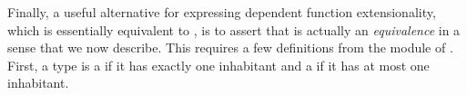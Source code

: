 Finally, a useful alternative for expressing dependent function extensionality, which is essentially equivalent to , is to assert that  is actually an \emph{equivalence} in a sense that we now describe. This requires a few definitions from the  module of \typtop. First, a type is a  if it has exactly one inhabitant and a  if it has at most one inhabitant.
\ccpad
\begin{code}%
\>[1]\AgdaSpace{}%
\AgdaSymbol{:}\AgdaSpace{}%
\AgdaSymbol{(}\AgdaSpace{}%
\AgdaSymbol{:}\AgdaSpace{}%
\AgdaSpace{}%
\AgdaSpace{}%
\AgdaSymbol{)}\AgdaSpace{}%
\AgdaSpace{}%
\AgdaSpace{}%
\AgdaSpace{}%
\AgdaSpace{}%
\<%
\\
%
\>[1]\AgdaSpace{}%
\AgdaSpace{}%
\AgdaSpace{}%
\AgdaSymbol{=}\AgdaSpace{}%
\AgdaSymbol{(}\AgdaSpace{}%
\AgdaSymbol{:}\AgdaSpace{}%
\AgdaSymbol{)}\AgdaSpace{}%
\AgdaSpace{}%
\AgdaSpace{}%
\AgdaSpace{}%
\<%
\end{code}
\scpad
\begin{code}
\>[1]\AgdaSpace{}%
\AgdaSymbol{:}\AgdaSpace{}%
\AgdaSpace{}%
\AgdaSpace{}%
\AgdaSpace{}%
\AgdaSpace{}%
\<%
\\
%
\>[1]\AgdaSpace{}%
\AgdaSpace{}%
\AgdaSymbol{=}\AgdaSpace{}%
\AgdaSpace{}%
\AgdaSpace{}%
\AgdaSpace{}%
\AgdaSpace{}%
\AgdaFunction{,}\AgdaSpace{}%
\AgdaSpace{}%
\AgdaSpace{}%
\<%
\end{code}
\scpad
\begin{code}
\>[1]\AgdaSpace{}%
\AgdaSymbol{:}\AgdaSpace{}%
\AgdaSpace{}%
\AgdaSpace{}%
\AgdaSpace{}%
\AgdaSpace{}%
\<%
\\
%
\>[1]\AgdaSpace{}%
\AgdaSpace{}%
\AgdaSymbol{=}\AgdaSpace{}%
\AgdaSymbol{(}\AgdaSpace{}%
\AgdaSpace{}%
\AgdaSymbol{:}\AgdaSpace{}%
\AgdaSymbol{)}\AgdaSpace{}%
\AgdaSpace{}%
\AgdaSpace{}%
\AgdaSpace{}%
\<%
\end{code}
